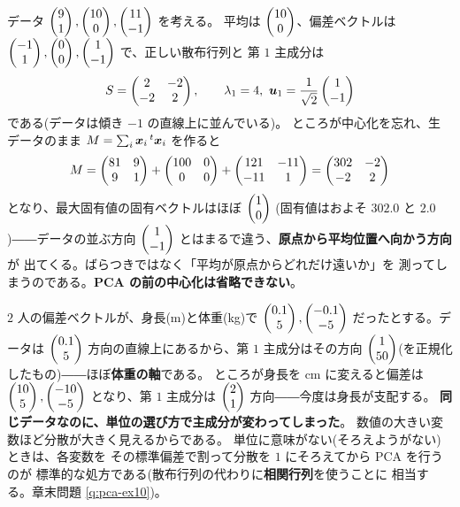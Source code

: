 \begin{hanrei}\label{hanrei:pca-center}
データ $\begin{pmatrix}9 \\ 1\end{pmatrix}, \begin{pmatrix}10 \\ 0\end{pmatrix}, \begin{pmatrix}11 \\ -1\end{pmatrix}$ を考える。
平均は $\begin{pmatrix}10 \\ 0\end{pmatrix}$、偏差ベクトルは
$\begin{pmatrix}-1 \\ 1\end{pmatrix}, \begin{pmatrix}0 \\ 0\end{pmatrix}, \begin{pmatrix}1 \\ -1\end{pmatrix}$ で、正しい散布行列と
第 $1$ 主成分は
\[
S = \begin{pmatrix}2 & -2 \\ -2 & 2\end{pmatrix}, \qquad
\lambda_1 = 4,\ \bm{u}_1 = \frac{1}{\sqrt{2}}\begin{pmatrix}1 \\ -1\end{pmatrix}
\]
である(データは傾き $-1$ の直線上に並んでいる)。
ところが中心化を忘れ、生データのまま
$M = \sum_i \bm{x}_i\,{}^t\bm{x}_i$ を作ると
\[
M = \begin{pmatrix}81 & 9 \\ 9 & 1\end{pmatrix} + \begin{pmatrix}100 & 0 \\ 0 & 0\end{pmatrix}
+ \begin{pmatrix}121 & -11 \\ -11 & 1\end{pmatrix} = \begin{pmatrix}302 & -2 \\ -2 & 2\end{pmatrix}
\]
となり、最大固有値の固有ベクトルはほぼ $\begin{pmatrix}1 \\ 0\end{pmatrix}$
(固有値はおよそ $302.0$ と $2.0$)――データの並ぶ方向
$\begin{pmatrix}1 \\ -1\end{pmatrix}$ とはまるで違う、\textbf{原点から平均位置へ向かう方向}が
出てくる。ばらつきではなく「平均が原点からどれだけ遠いか」を
測ってしまうのである。\textbf{PCA の前の中心化は省略できない}。
\end{hanrei}

\begin{hanrei}[単位を変えると主成分が変わる]\label{hanrei:pca-scale}
$2$ 人の偏差ベクトルが、身長(m)と体重(kg)で
$\begin{pmatrix}0.1 \\ 5\end{pmatrix}, \begin{pmatrix}-0.1 \\ -5\end{pmatrix}$ だったとする。データは
$\begin{pmatrix}0.1 \\ 5\end{pmatrix}$ 方向の直線上にあるから、第 $1$ 主成分はその方向
$\begin{pmatrix}1 \\ 50\end{pmatrix}$(を正規化したもの)――ほぼ\textbf{体重の軸}である。
ところが身長を cm に変えると偏差は $\begin{pmatrix}10 \\ 5\end{pmatrix}, \begin{pmatrix}-10 \\ -5\end{pmatrix}$
となり、第 $1$ 主成分は $\begin{pmatrix}2 \\ 1\end{pmatrix}$ 方向――今度は身長が支配する。
\textbf{同じデータなのに、単位の選び方で主成分が変わってしまった}。
数値の大きい変数ほど分散が大きく見えるからである。
単位に意味がない(そろえようがない)ときは、各変数を
その標準偏差で割って分散を $1$ にそろえてから PCA を行うのが
標準的な処方である(散布行列の代わりに\textbf{相関行列}を使うことに
相当する。章末問題 \ref{q:pca-ex10})。
\end{hanrei}


